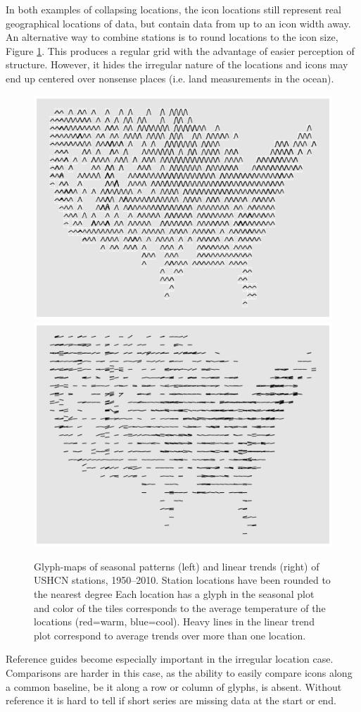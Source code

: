 \documentclass[oneside]{article}
\begin{document}
In both examples of collapsing locations, the icon locations still represent real geographical locations of data, but contain data from up to an icon width away.  An alternative way to combine stations is to round locations to the icon size, Figure \ref{fig:irregular-grid}. This produces a regular grid with the advantage of easier perception of structure.  However, it hides the irregular nature of the locations and icons may end up centered over nonsense places (i.e. land measurements in the ocean).

\begin{figure}[htbp]
  \centering
  \includegraphics[width=0.5\linewidth]{usa-season-grid}%
  \includegraphics[width=0.5\linewidth]{usa-lin-grid}%
  \caption{Glyph-maps of seasonal patterns (left) and linear trends (right) of USHCN stations, 1950--2010.  Station locations have been rounded to the nearest degree Each location has a glyph in the seasonal plot and color of the tiles corresponds to the average temperature of the locations (red=warm, blue=cool).  Heavy lines in the linear trend plot correspond to average trends over more than one location.}
  \label{fig:irregular-grid}
\end{figure}

Reference guides become especially important in the irregular location case. Comparisons are harder in this case, as the ability to easily compare icons along a common baseline, be it along a row or column of glyphs, is absent. Without reference it is hard to tell if short series are missing data at the start or end.  
\end{document}
